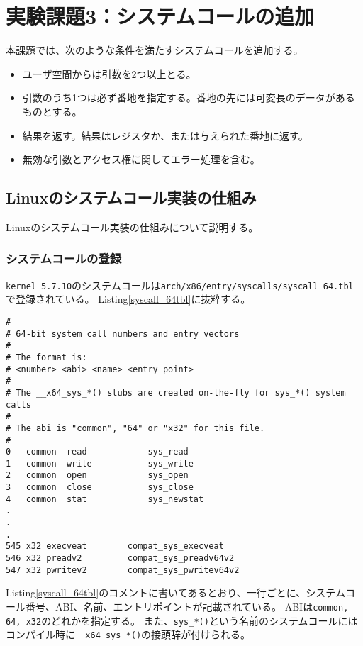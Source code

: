 \documentclass[main]{subfiles}
\begin{document}
\section{実験課題3：システムコールの追加}

本課題では、次のような条件を満たすシステムコールを追加する。

\begin{itemize}
 \item ユーザ空間からは引数を2つ以上とる。
 \item 引数のうち1つは必ず番地を指定する。番地の先には可変長のデータがあるものとする。
 \item 結果を返す。結果はレジスタか、または与えられた番地に返す。
 \item 無効な引数とアクセス権に関してエラー処理を含む。
\end{itemize}

\subsection{Linuxのシステムコール実装の仕組み}
\label{syscall_sikumi}

Linuxのシステムコール実装の仕組みについて説明する。

\subsubsection{システムコールの登録}

\texttt{kernel 5.7.10}のシステムコールは\texttt{arch/x86/entry/syscalls/syscall\_64.tbl}で登録されている。
Listing\ref{syscall_64tbl}に抜粋する。

\begin{lstlisting}[label=syscall_64tbl,caption=syscall\_64.tblの一部]
#
# 64-bit system call numbers and entry vectors
#
# The format is:
# <number> <abi> <name> <entry point>
#
# The __x64_sys_*() stubs are created on-the-fly for sys_*() system calls
#
# The abi is "common", "64" or "x32" for this file.
#
0	common	read			sys_read
1	common	write			sys_write
2	common	open			sys_open
3	common	close			sys_close
4	common	stat			sys_newstat
.
.
.
545	x32	execveat		compat_sys_execveat
546	x32	preadv2			compat_sys_preadv64v2
547	x32	pwritev2		compat_sys_pwritev64v2
\end{lstlisting}

Listing\ref{syscall_64tbl}のコメントに書いてあるとおり、一行ごとに、システムコール番号、ABI、名前、エントリポイントが記載されている。
ABIは\texttt{common, 64, x32}のどれかを指定する。
また、\texttt{sys\_*()}という名前のシステムコールにはコンパイル時に\texttt{\_\_x64\_sys\_*()}の接頭辞が付けられる。
\end{document}
